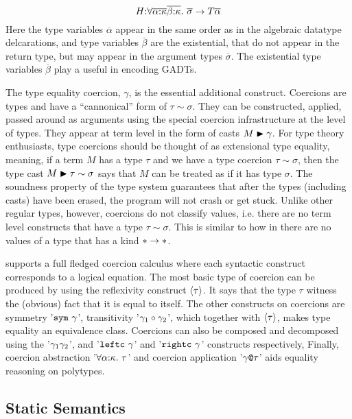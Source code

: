 \documentclass[manuscript,screen,nonacm]{acmart}
\begin{document}
$$
H {:} \forall\overline{\alpha{:}\kappa}\overline{\beta{:}\kappa}.~\overline{\sigma} \to T \overline\alpha
$$
Here the type variables $\overline\alpha$ appear in the same order as in the algebraic datatype delcarations,  and type variables $\overline\beta$ are the existential, that do not appear in the return type, but may appear in the argument types $\overline\sigma$. The existential type variables $\overline\beta$ play a useful in encoding GADTs.

The type equality coercion, $\gamma$, is the essential additional construct. Coercions are types and have a ``cannonical'' form of $\tau\sim\sigma$. They can be constructed, applied, passed around as arguments using the special coercion infrastructure at the level of types. They appear at term level in the form of casts $M\mathrel{\blacktriangleright}\gamma$. For type theory enthusiasts, type coercions should be thought of as extensional type equality, meaning, if a term $M$ has a type $\tau$ and we have a type coercion $\tau\sim\sigma$, then the type cast $M\mathrel{\blacktriangleright}\tau\sim\sigma$ says that $M$ can be treated as if it has type $\sigma$. The soundness property of the type system guarantees that after the types (including casts) have been erased, the program will not crash or get stuck. Unlike other regular types, however, coercions do not classify values, i.e. there are no term level constructs that have a type $\tau\sim\sigma$. This is similar to how in \SFw there are no values of a type that has a kind $\ast\to\ast$.

\SFC supports a full fledged coercion calculus where each syntactic construct corresponds to a logical equation. The most basic type of coercion can be produced by using the reflexivity construct $\langle\tau\rangle$. It says that the type $\tau$ witness the (obvious) fact that it is equal to itself. The other constructs on coercions are symmetry '$\texttt{sym}~{\gamma}$', transitivity '$\gamma_1 \circ \gamma_2$', which together with $\langle\tau\rangle$, makes type equality an equivalence class. Coercions can also be composed and decomposed using the '$\gamma_1\gamma_2$', and '$\texttt{leftc}~\gamma$' and '$\texttt{rightc}~\gamma$' constructs respectively, Finally, coercion abstraction '$\forall\alpha{:}\kappa.~\tau$' and coercion application '$\gamma\texttt{@}\tau$' aids equality reasoning on polytypes.

\subsection{Static Semantics}

\newcommand\TCast{
  \ib{\irule[\trule{cast}]
    {\Typing \TEnv {\Tm} {\tau}}
    {\Typing \TEnv \gamma {\tau \sim \sigma}};
    {\Typing \TEnv {\Cast \Tm \gamma} {\sigma}}
  }
}
\end{document}
